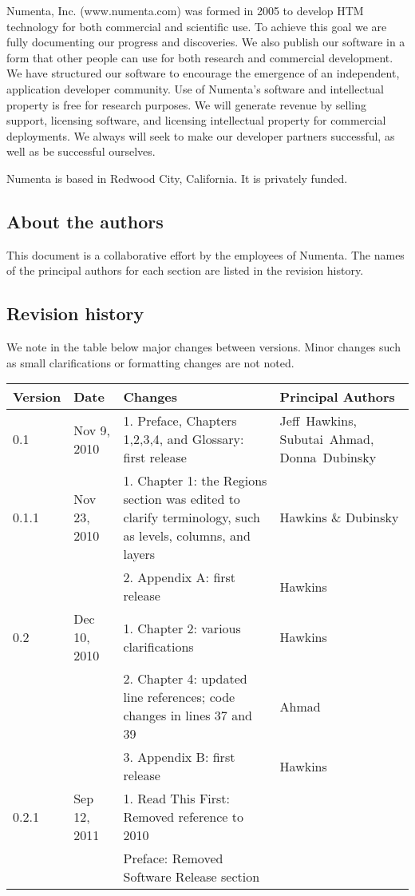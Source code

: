 \documentclass{report}
\begin{document}
Numenta, Inc. (www.numenta.com) was formed in 2005 to develop HTM
technology for both commercial and scientific use. To achieve this
goal we are fully documenting our progress and discoveries. We also
publish our software in a form that other people can use for both
research and commercial development. We have structured our software
to encourage the emergence of an independent, application developer
community. Use of Numenta's software and intellectual property is free
for research purposes. We will generate revenue by selling support,
licensing software, and licensing intellectual property for commercial
deployments. We always will seek to make our developer partners
successful, as well as be successful ourselves.

Numenta is based in Redwood City, California. It is privately funded.

\subsection*{About the authors}

This document is a collaborative effort by the employees of
Numenta. The names of the principal authors for each section are
listed in the revision history.

\pagebreak
\subsection*{Revision history}

We note in the table below major changes between versions. Minor
changes such as small clarifications or formatting changes are not
noted.

\vspace{5mm}
\begin{tabular}{|p{}|p{}|>{\raggedright}p{}|>{\raggedright\arraybackslash}p{}|}
\hline
Version & Date & Changes & Principal Authors \\
\hline
0.1 & Nov 9, 2010 & 1. Preface, Chapters 1,2,3,4, and Glossary: first release & Jeff~Hawkins, Subutai~Ahmad, Donna~Dubinsky \\
\hline
0.1.1 & Nov 23, 2010 & 1. Chapter 1: the Regions section was edited to clarify terminology, such as levels, columns, and layers & Hawkins \& Dubinsky \\
 & & 2. Appendix A: first release & Hawkins \\
\hline
0.2 & Dec 10, 2010 & 1. Chapter 2: various clarifications & Hawkins \\
 & & 2. Chapter 4: updated line references; code changes in lines 37 and 39 & Ahmad \\
 & & 3. Appendix B: first release & Hawkins \\
\hline
0.2.1 & Sep 12, 2011 & 1. Read This First: Removed reference to 2010 & \\
 & & Preface: Removed Software Release section & \\
\hline
\end{tabular}
\end{document}
